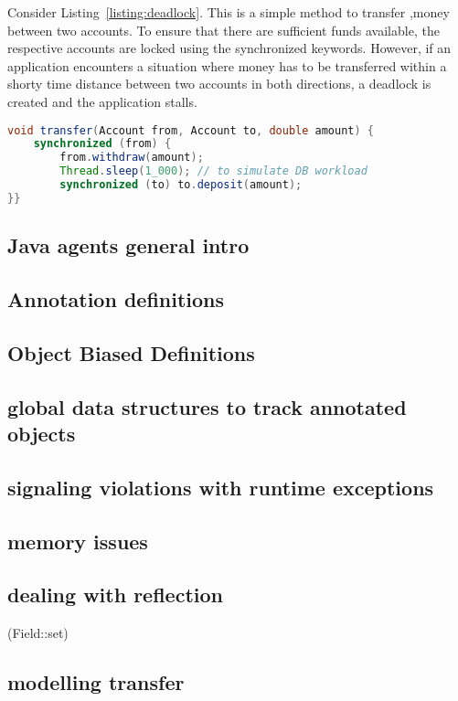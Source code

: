 \documentclass[../main.tex]{subfiles}
\begin{document}
Consider Listing~\ref{listing:deadlock}.  This is a simple method to transfer ,money between two accounts. To ensure that there are sufficient funds available, the respective accounts are locked using the  synchronized keywords.  However, if an application encounters a situation where money has to be transferred within a shorty time distance between two accounts in both directions, a deadlock is created and the application stalls.

\begin{lstlisting}[language=Java, caption=Money transfer implementation prone to deadlock, label=listing:deadlock]
void transfer(Account from, Account to, double amount) {
	synchronized (from) {
		from.withdraw(amount);
		Thread.sleep(1_000); // to simulate DB workload
		synchronized (to) to.deposit(amount);
}}
\end{lstlisting}



	
\subsection{Java agents general intro}

\subsection{Annotation definitions}

\subsection{Object Biased Definitions}

\subsection{global data structures to track annotated objects}

\subsection{signaling violations with runtime exceptions}

\subsection{memory issues}

\subsection{dealing with reflection}
(Field::set)

\subsection{modelling transfer}
\end{document}
